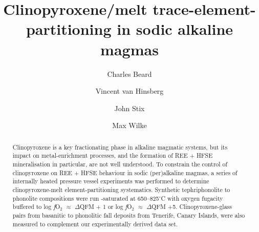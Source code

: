 \documentclass[final,authoryear,3p,times,twocolumn]{elsarticle}
\newcommand{\dgC}{$^\circ$C }
\newcommand{\fO}{\textit{f}O$_{2}$ }
\begin{document}
\begin{frontmatter}


%

\title{Clinopyroxene/melt trace-element-partitioning in sodic alkaline magmas}


\author[1]{Charles Beard}

\author[1]{Vincent van Hinsberg}
\author[1]{John Stix}
\author[2,3]{Max Wilke}

\address[1]{Earth and Planetary Sciences, McGill University, 3450 University Street, Montreal, Qu\'ebec, H3A 0E8, Canada}
\address[2]{Institut f\"ur Erd- und Umweltwissenschaften, Universit\"at Potsdam, Golm, Germany}
\address[3]{Chemie und Physik der Geomaterialien, Deutsches GeoForschungsZentrum GFZ, Potsdam, Germany}



\begin{abstract}
Clinopyroxene is a key fractionating phase in alkaline magmatic systems,
but its impact on metal-enrichment processes, and the formation of REE + HFSE mineralisation in particular, are not well understood.
To constrain the control of clinopyroxene on REE + HFSE behaviour in sodic (per)alkaline magmas, a series of internally heated pressure vessel experiments was performed to determine clinopyroxene-melt element-partitioning systematics. Synthetic tephriphonolite to phonolite compositions were run -saturated at 650--825\dgC with oxygen fugacity buffered to log \fO $\approx$ $\Delta$QFM + 1 or log \fO $\approx$ $\Delta$QFM +5. Clinopyroxene-glass pairs from basanitic to phonolitic fall deposits from Tenerife, Canary Islands, were also measured to complement our experimentally derived data set.


\end{abstract}
\end{frontmatter}
\end{document}
